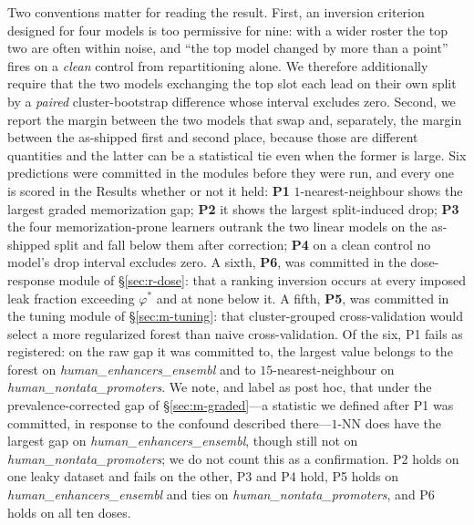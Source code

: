 \documentclass[webpdf,modern,large,namedate]{oup-authoring-template}%
\begin{document}
Two conventions matter for reading the result. First, an inversion criterion designed for four models is too permissive for nine: with a wider roster the top two are often within noise, and ``the top model changed by more than a point'' fires on a \emph{clean} control from repartitioning alone. We therefore additionally require that the two models exchanging the top slot each lead on their own split by a \emph{paired} cluster-bootstrap difference whose interval excludes zero. Second, we report the margin between the two models that swap and, separately, the margin between the as-shipped first and second place, because those are different quantities and the latter can be a statistical tie even when the former is large. Six predictions were committed in the modules before they were run, and every one is scored in the Results whether or not it held: \textbf{P1} $1$-nearest-neighbour shows the largest graded memorization gap; \textbf{P2} it shows the largest split-induced drop; \textbf{P3} the four memorization-prone learners outrank the two linear models on the as-shipped split and fall below them after correction; \textbf{P4} on a clean control no model's drop interval excludes zero. A sixth, \textbf{P6}, was committed in the dose-response module of \S\ref{sec:r-dose}: that a ranking inversion occurs at every imposed leak fraction exceeding $\varphi^{*}$ and at none below it. A fifth, \textbf{P5}, was committed in the tuning module of \S\ref{sec:m-tuning}: that cluster-grouped cross-validation would select a more regularized forest than naive cross-validation. Of the six, P1 fails as registered: on the raw gap it was committed to, the largest value belongs to the forest on \textit{human\_enhancers\_ensembl} and to $15$-nearest-neighbour on \textit{human\_nontata\_promoters}. We note, and label as post hoc, that under the prevalence-corrected gap of \S\ref{sec:m-graded}---a statistic we defined after P1 was committed, in response to the confound described there---$1$-NN does have the largest gap on \textit{human\_enhancers\_ensembl}, though still not on \textit{human\_nontata\_promoters}; we do not count this as a confirmation. P2 holds on one leaky dataset and fails on the other, P3 and P4 hold, P5 holds on \textit{human\_enhancers\_ensembl} and ties on \textit{human\_nontata\_promoters}, and P6 holds on all ten doses.
\end{document}
